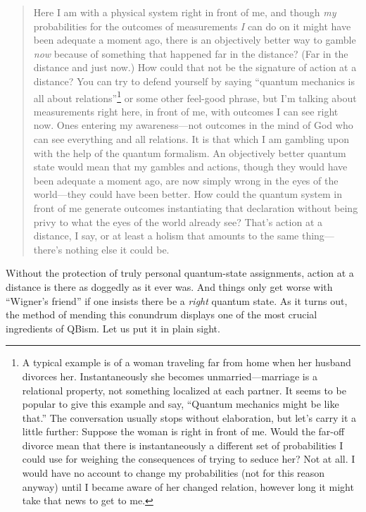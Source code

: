 \begin{quotation}
\small Here I am with a physical system right in front of me, and though {\it my\/} probabilities for the outcomes of measurements {\it I\/} can do on it might have been adequate a moment ago, there is an objectively better way to gamble {\it now\/} because of something that happened far in the distance?  (Far in the distance and just now.)  How could that not be the signature of action at a distance?  You can try to defend yourself by saying ``quantum mechanics is all about relations''\footnote{A typical example is of a woman traveling far from home when her husband divorces her.  Instantaneously she becomes unmarried---marriage is a relational property, not something localized at each partner.  It seems to be popular to give this example and say, ``Quan\-tum mechanics might be like that.''  The conversation usually stops without elaboration, but let's carry it a little further:  Suppose the woman is right in front of me.  Would the far-off divorce mean that there is instantaneously a different set of probabilities I could use for weighing the consequences of trying to seduce her?  Not at all.  I would have no account to change my probabilities (not for this reason anyway) until I became aware of her changed relation, however long it might take that news to get to me.} or some other feel-good phrase, but I'm talking about measurements right here, in front of me, with outcomes I can see right now.  Ones entering my awareness---not outcomes in the mind of God who can see everything and all relations.  It is that which I am gambling upon with the help of the quantum formalism.  An objectively better quantum state would mean that my gambles and actions, though they would have been adequate a moment ago, are now simply wrong in the eyes of the world---they could have been better.  How could the quantum system in front of me generate outcomes instantiating that declaration without being privy to what the eyes of the world already see?  That's action at a distance, I say, or at least a holism that amounts to the same thing---there's nothing else it could be.
\end{quotation}

Without the protection of truly personal quantum-state assignments, action at a distance is there as doggedly as it ever was.  And things only get worse with ``Wigner's friend'' if one insists there be a {\it right\/} quantum state.  As it turns out, the method of mending this conundrum displays one of the most crucial ingredients of QBism.  Let us put it in plain sight.

